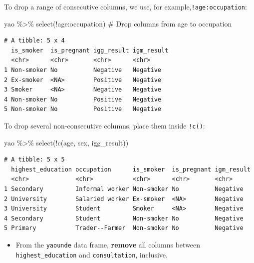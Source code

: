 \documentclass[
  letterpaper,
  DIV=11,
  numbers=noendperiod]{scrreprt}
\newenvironment{Shaded}{\begin{snugshade}}{\end{snugshade}}
\newcommand{\CommentTok}[1]{\textcolor[rgb]{0.37,0.37,0.37}{#1}}
\newcommand{\FunctionTok}[1]{\textcolor[rgb]{0.28,0.35,0.67}{#1}}
\newcommand{\NormalTok}[1]{\textcolor[rgb]{0.00,0.23,0.31}{#1}}
\newcommand{\SpecialCharTok}[1]{\textcolor[rgb]{0.37,0.37,0.37}{#1}}
\providecommand{\tightlist}{%
  \setlength{\itemsep}{0pt}\setlength{\parskip}{0pt}}\usepackage{longtable,booktabs,array}
\begin{document}
To drop a range of consecutive columns, we use, for
example,\texttt{!age:occupation}:

\begin{Shaded}
\begin{Highlighting}[]
\NormalTok{yao }\SpecialCharTok{\%\textgreater{}\%} \FunctionTok{select}\NormalTok{(}\SpecialCharTok{!}\NormalTok{age}\SpecialCharTok{:}\NormalTok{occupation) }\CommentTok{\# Drop columns from \textasciigrave{}age\textasciigrave{} to \textasciigrave{}occupation\textasciigrave{}}
\end{Highlighting}
\end{Shaded}

\begin{verbatim}
# A tibble: 5 x 4
  is_smoker  is_pregnant igg_result igm_result
  <chr>      <chr>       <chr>      <chr>     
1 Non-smoker No          Negative   Negative  
2 Ex-smoker  <NA>        Positive   Negative  
3 Smoker     <NA>        Negative   Negative  
4 Non-smoker No          Positive   Negative  
5 Non-smoker No          Positive   Negative  
\end{verbatim}

To drop several non-consecutive columns, place them inside
\texttt{!c()}:

\begin{Shaded}
\begin{Highlighting}[]
\NormalTok{yao }\SpecialCharTok{\%\textgreater{}\%} \FunctionTok{select}\NormalTok{(}\SpecialCharTok{!}\FunctionTok{c}\NormalTok{(age, sex, igg\_result))}
\end{Highlighting}
\end{Shaded}

\begin{verbatim}
# A tibble: 5 x 5
  highest_education occupation      is_smoker  is_pregnant igm_result
  <chr>             <chr>           <chr>      <chr>       <chr>     
1 Secondary         Informal worker Non-smoker No          Negative  
2 University        Salaried worker Ex-smoker  <NA>        Negative  
3 University        Student         Smoker     <NA>        Negative  
4 Secondary         Student         Non-smoker No          Negative  
5 Primary           Trader--Farmer  Non-smoker No          Negative  
\end{verbatim}

\begin{tcolorbox}[enhanced jigsaw, title=\textcolor{quarto-callout-tip-color}{\faLightbulb}\hspace{0.5em}{Practice}, colbacktitle=quarto-callout-tip-color!10!white, leftrule=.75mm, arc=.35mm, opacityback=0, bottomrule=.15mm, rightrule=.15mm, toptitle=1mm, breakable, toprule=.15mm, colback=white, coltitle=black, colframe=quarto-callout-tip-color-frame, bottomtitle=1mm, titlerule=0mm, left=2mm, opacitybacktitle=0.6]

\begin{itemize}
\tightlist
\item
  From the \texttt{yaounde} data frame, \textbf{remove} all columns
  between \texttt{highest\_education} and \texttt{consultation},
  inclusive.
\end{itemize}

\end{tcolorbox}
\end{document}
